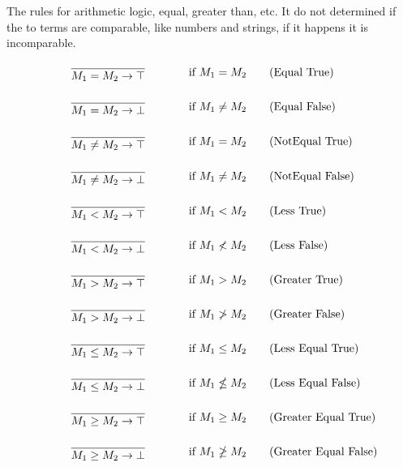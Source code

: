 The rules for arithmetic logic, equal, greater than, etc. It do not determined if the to terms are comparable, like numbers and strings, if it happens it is incomparable.
\begin{align*}
    \infrule{}{M_1 = M_2 \ra \top}& \text{if }M_1=M_2 \tag{Equal True}\\
    \infrule{}{M_1 = M_2 \ra \bot}& \text{if }M_1\neq M_2 \tag{Equal False}\\
    \infrule{}{M_1 \neq M_2 \ra \top}& \text{if }M_1=M_2 \tag{NotEqual True}\\
    \infrule{}{M_1 \neq M_2 \ra \bot}& \text{if }M_1\neq M_2 \tag{NotEqual False}\\
    \infrule{}{M_1 < M_2 \ra \top}& \text{if }M_1<M_2 \tag{Less True}\\
    \infrule{}{M_1 < M_2 \ra \bot}& \text{if }M_1\nless M_2 \tag{Less False}\\
    \infrule{}{M_1 > M_2 \ra \top}& \text{if }M_1>M_2 \tag{Greater True}\\
    \infrule{}{M_1 > M_2 \ra \bot}& \text{if }M_1\ngtr M_2 \tag{Greater False}\\
    \infrule{}{M_1 \leq M_2 \ra \top}& \text{if }M_1\leq M_2 \tag{Less Equal True}\\
    \infrule{}{M_1 \leq M_2 \ra \bot}& \text{if }M_1\nleq M_2 \tag{Less Equal False}\\
    \infrule{}{M_1 \geq M_2 \ra \top}& \text{if }M_1\geq M_2 \tag{Greater Equal True}\\
    \infrule{}{M_1 \geq M_2 \ra \bot}& \text{if }M_1\ngeq M_2 \tag{Greater Equal False}
\end{align*}


\FloatBarrier



